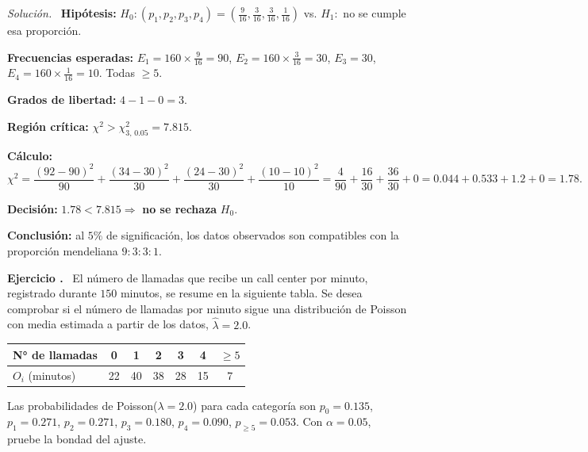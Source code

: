 \documentclass[11pt,a4paper]{article}
\newcounter{ejnum}
\newenvironment{ejercicio}{\refstepcounter{ejnum}\par\medskip\noindent\textbf{Ejercicio \theejnum.}~}{\par}
\newenvironment{solucion}{\par\noindent\textit{Solución.}~}{\par\vspace{1em}}
\begin{document}
\begin{solucion}
\textbf{Hipótesis:} $H_0: (p_1,p_2,p_3,p_4)=\left(\tfrac{9}{16},\tfrac{3}{16},\tfrac{3}{16},\tfrac{1}{16}\right)$ vs. $H_1:$ no se cumple esa proporción.

\textbf{Frecuencias esperadas:} $E_1=160\times\tfrac{9}{16}=90$, $E_2=160\times\tfrac{3}{16}=30$, $E_3=30$, $E_4=160\times\tfrac{1}{16}=10$. Todas $\ge5$.

\textbf{Grados de libertad:} $4-1-0=3$.

\textbf{Región crítica:} $\chi^2>\chi^2_{3,\,0.05}=7.815$.

\textbf{Cálculo:}
\[
\chi^2=\frac{(92-90)^2}{90}+\frac{(34-30)^2}{30}+\frac{(24-30)^2}{30}+\frac{(10-10)^2}{10}=\frac{4}{90}+\frac{16}{30}+\frac{36}{30}+0=0.044+0.533+1.2+0=1.78.
\]

\textbf{Decisión:} $1.78<7.815\Rightarrow$ \textbf{no se rechaza} $H_0$.

\textbf{Conclusión:} al $5\%$ de significación, los datos observados son compatibles con la proporción mendeliana $9:3:3:1$.
\end{solucion}

\begin{ejercicio}
El número de llamadas que recibe un call center por minuto, registrado durante $150$ minutos, se resume en la siguiente tabla. Se desea comprobar si el número de llamadas por minuto sigue una distribución de Poisson con media estimada a partir de los datos, $\hat\lambda=2.0$.
\begin{center}
\begin{tabular}{@{}lcccccc@{}}
\toprule
N° de llamadas & 0 & 1 & 2 & 3 & 4 & $\ge5$ \\
\midrule
$O_i$ (minutos) & 22 & 40 & 38 & 28 & 15 & 7 \\
\bottomrule
\end{tabular}
\end{center}
Las probabilidades de Poisson($\lambda=2.0$) para cada categoría son $p_0=0.135$, $p_1=0.271$, $p_2=0.271$, $p_3=0.180$, $p_4=0.090$, $p_{\ge5}=0.053$. Con $\alpha=0.05$, pruebe la bondad del ajuste.
\end{ejercicio}
\end{document}
